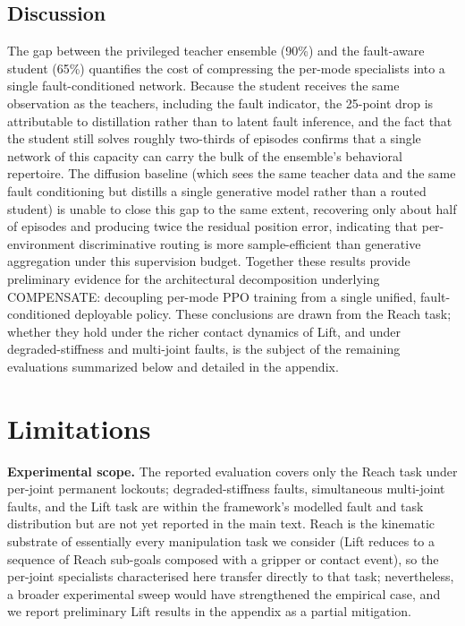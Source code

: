 \documentclass{article}
\begin{document}
	\subsection{Discussion}
	\label{subsec:results-discussion}

		The gap between the privileged teacher ensemble (90\%) and the fault-aware
		student (65\%) quantifies the cost of compressing the per-mode specialists
		into a single fault-conditioned network. Because the student receives the
		same observation as the teachers, including the fault indicator, the 25-point
		drop is attributable to distillation rather than to latent fault inference,
		and the fact that the student still solves roughly two-thirds of episodes
		confirms that a single network of this capacity can carry the bulk of the
		ensemble's behavioral repertoire. The diffusion
		baseline (which sees the same teacher data and the same fault conditioning
		but distills a single generative model rather than a routed student) is
		unable to close this gap to the same extent, recovering only about half of
		episodes and producing twice the residual position error, indicating that
		per-environment discriminative routing is more sample-efficient than
		generative aggregation under this supervision budget. Together these results
		provide preliminary evidence for the architectural decomposition underlying COMPENSATE:
		decoupling per-mode PPO training from a single unified, fault-conditioned
		deployable policy. These conclusions are drawn from the Reach task; whether
		they hold under the richer contact dynamics of Lift, and under
		degraded-stiffness and multi-joint faults, is the subject of the remaining
		evaluations summarized below and detailed in the appendix.


\section{Limitations}
\label{sec:limitations}

	\textbf{Experimental scope.} The reported evaluation covers only the Reach task under per-joint
	permanent lockouts; degraded-stiffness faults, simultaneous multi-joint faults, and the Lift
	task are within the framework's modelled fault and task distribution but are
	not yet reported in the main text. Reach is the kinematic substrate of essentially every
	manipulation task we consider (Lift reduces to a sequence of Reach
	sub-goals composed with a gripper or contact event), so the per-joint specialists characterised
	here transfer directly to that task; nevertheless, a broader experimental sweep would have
	strengthened the empirical case, and we report preliminary Lift results in
	the appendix as a partial mitigation.
\end{document}
